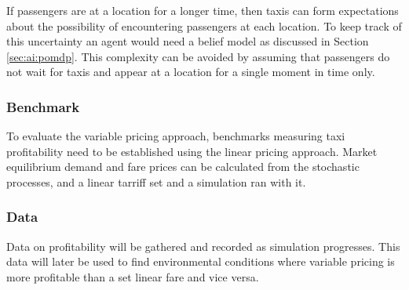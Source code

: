 If passengers are at a location for a longer time, then taxis can form
expectations about the possibility of encountering passengers at each location.
To keep track of this uncertainty an agent would need a belief model as
discussed in Section \ref{sec:ai:pomdp}. This complexity can be avoided by
assuming that passengers do not wait for taxis and appear at a location for a
single moment in time only. 



\subsubsection{Benchmark} 

To evaluate the variable pricing approach, benchmarks measuring taxi
profitability need to be established using the linear pricing approach. Market
equilibrium demand and fare prices can be calculated from the stochastic
processes, and a linear tarriff set and a simulation ran with it.

\subsubsection{Data}

Data on profitability will be gathered and recorded as simulation progresses.
This data will later be used to find environmental conditions where variable
pricing is more profitable than a set linear fare and vice versa.
